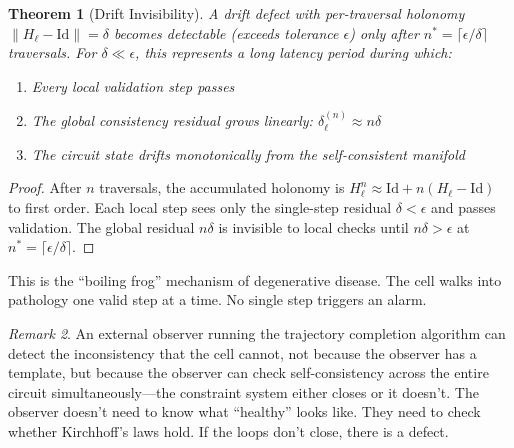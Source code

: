 \documentclass[10pt,twocolumn,a4paper]{article}
\theoremstyle{plain}
\newtheorem{theorem}{Theorem}[section]
\theoremstyle{definition}
\theoremstyle{remark}
\newtheorem{remark}[theorem]{Remark}
\begin{document}
\begin{theorem}[Drift Invisibility]
\label{thm:drift}
A drift defect with per-traversal holonomy $\|H_\ell - \mathrm{Id}\| = \delta$ becomes detectable (exceeds tolerance $\epsilon$) only after $n^* = \lceil\epsilon/\delta\rceil$ traversals. For $\delta \ll \epsilon$, this represents a long latency period during which:
\begin{enumerate}[label=(\roman*)]
    \item Every local validation step passes
    \item The global consistency residual grows linearly: $\delta_\ell^{(n)} \approx n\delta$
    \item The circuit state drifts monotonically from the self-consistent manifold
\end{enumerate}
\end{theorem}

\begin{proof}
After $n$ traversals, the accumulated holonomy is $H_\ell^n \approx \mathrm{Id} + n(H_\ell - \mathrm{Id})$ to first order. Each local step sees only the single-step residual $\delta < \epsilon$ and passes validation. The global residual $n\delta$ is invisible to local checks until $n\delta > \epsilon$ at $n^* = \lceil\epsilon/\delta\rceil$.
\end{proof}

This is the ``boiling frog'' mechanism of degenerative disease. The cell walks into pathology one valid step at a time. No single step triggers an alarm.

\begin{remark}
An external observer running the trajectory completion algorithm can detect the inconsistency that the cell cannot, not because the observer has a template, but because the observer can check self-consistency across the entire circuit simultaneously---the constraint system either closes or it doesn't. The observer doesn't need to know what ``healthy'' looks like. They need to check whether Kirchhoff's laws hold. If the loops don't close, there is a defect.
\end{remark}
\end{document}
